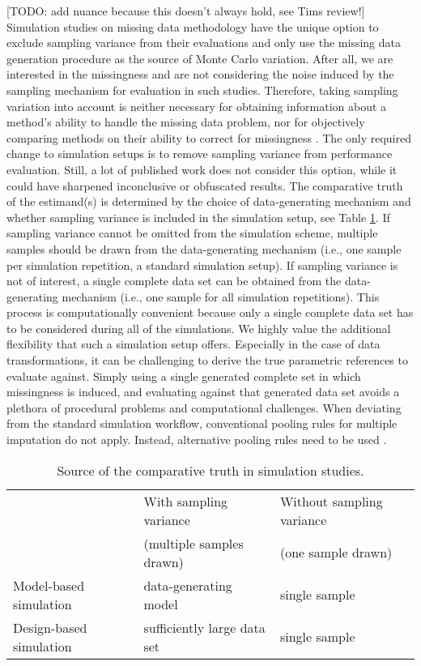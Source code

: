 \documentclass[bimj,fleqn]{w-art}
\begin{document}
[TODO: add nuance because this doesn't always hold, see Tims review!] Simulation studies on missing data methodology have the unique option to exclude sampling variance from their evaluations and only use the missing data generation procedure as the source of Monte Carlo variation. After all, we are interested in the missingness and are not considering the noise induced by the sampling mechanism for evaluation in such studies. Therefore, taking sampling variation into account is neither necessary for obtaining information about a method's ability to handle the missing data problem, nor for objectively comparing methods on their ability to correct for missingness \citep[see for a detailed discussion][]{vink14}. The only required change to simulation setups is to remove sampling variance from performance evaluation. Still, a lot of published work does not consider this option, while it could have sharpened inconclusive or obfuscated results. The comparative truth of the estimand(s) is determined by the choice of data-generating mechanism and whether sampling variance is included in the simulation setup, see Table \ref{table:dgm_truth}. If sampling variance cannot be omitted from the simulation scheme, multiple samples should be drawn from the data-generating mechanism (i.e., one sample per simulation repetition, a standard simulation setup). If sampling variance is not of interest, a single complete data set can be obtained from the data-generating mechanism (i.e., one sample for all simulation repetitions). This process is computationally convenient because only a single complete data set has to be considered during all of the simulations. We highly value the additional flexibility that such a simulation setup offers. Especially in the case of data transformations, it can be challenging to derive the true parametric references to evaluate against. Simply using a single generated complete set in which missingness is induced, and evaluating against that generated data set avoids a plethora of procedural problems and computational challenges.
When deviating from the standard simulation workflow, conventional pooling rules for multiple imputation \citep[cf.][p. 76-77]{rubi87} do not apply. Instead, alternative pooling rules need to be used \citep{raghunathan2003multiple,vink14}.

\begin{table}[tb]
\begin{center}
\caption{Source of the comparative truth in simulation studies.}
\label{table:dgm_truth}
\begin{tabular}{lll}
\hline
               & With sampling variance      & Without sampling variance \\
               & (multiple samples drawn)    & (one sample drawn) \\
\hline  
Model-based simulation   & data-generating model         & single sample \\
Design-based simulation  & sufficiently large data set   & single sample \\
\hline
\end{tabular}
\end{center}
\end{table}
\end{document}
